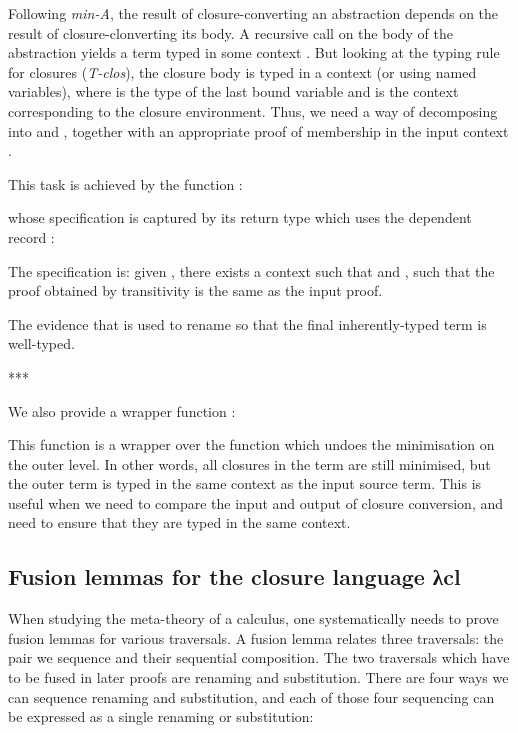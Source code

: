 \documentclass[bsc,frontabs,oneside,singlespacing,parskip,deptreport]{infthesis}
\theoremstyle{definition}
\theoremstyle{lemma}
\begin{document}

Following \textit{min-A}, the result of closure-converting an
abstraction depends on the result  of closure-clonverting its
body. A recursive call on the body of the abstraction yields a term
typed in some context . But looking at the typing rule for
closures (\textit{T-clos}), the closure body is typed in a context
 (or  using named variables), where  is
the type of the last bound variable and  is the context
corresponding to the closure environment. Thus, we need a way of
decomposing  into  and , together with an
appropriate proof of membership in the input context .

This task is achieved by the function :


whose specification is captured by its return type which uses the
dependent record :


The specification is: given , there exists a context
 such that  and , such that the
proof  obtained by transitivity is the same as the input
proof.

The evidence that  is used to rename  so that
the final inherently-typed term is well-typed.

***

We also provide a wrapper function :


This function is a wrapper over the  function which undoes
the minimisation on the outer level. In other words, all closures in
the term are still minimised, but the outer term is typed in the same
context as the input source term. This is useful when we need to
compare the input and output of closure conversion, and need to ensure
that they are typed in the same context.

\subsection{Fusion lemmas for the closure language λcl}

When studying the meta-theory of a calculus, one systematically needs
to prove fusion lemmas for various traversals. A fusion lemma relates
three traversals: the pair we sequence and their sequential
composition. The two traversals which have to be fused in later proofs
are renaming and substitution. There are four ways we can sequence
renaming and substitution, and each of those four sequencing can be
expressed as a single renaming or substitution:
\end{document}
